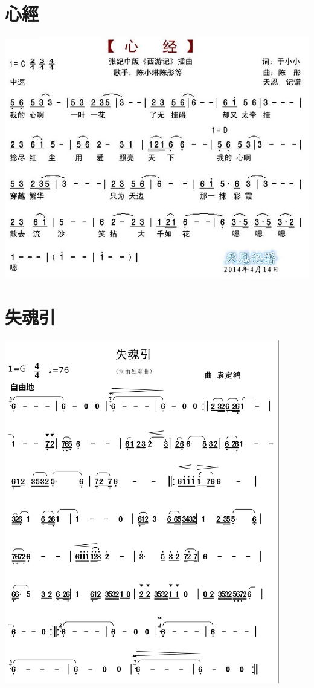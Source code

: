 \documentclass[cn,pad,twocol]{elegantbook}
\begin{document}
\section{心經}      \includegraphics[width=\textwidth]{dongxiao/20201231-心经} 
\section{失魂引}    \includegraphics[width=0.9\textwidth]{rpi400/20201226失魂引.png}
\end{document}
